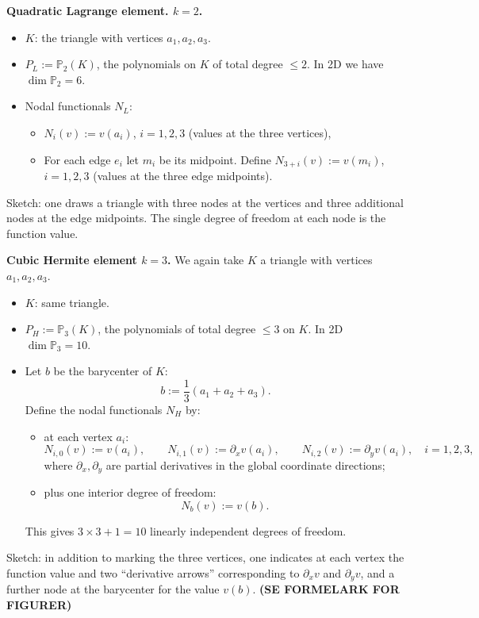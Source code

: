 \textbf{Quadratic Lagrange element. $k=2$.}
\begin{itemize}
    \item $K$: the triangle with vertices $a_1,a_2,a_3$.
    \item $P_L := \mathbb{P}_2(K)$, the polynomials on $K$ of total degree $\le 2$.
          In 2D we have $\dim \mathbb{P}_2 = 6$.
    \item Nodal functionals $N_L$:
          \begin{itemize}
              \item $N_i(v) := v(a_i)$, $i=1,2,3$ (values at the three vertices),
              \item For each edge $e_i$ let $m_i$ be its midpoint.
                    Define $N_{3+i}(v) := v(m_i)$, $i=1,2,3$ (values at the three edge midpoints).
          \end{itemize}
\end{itemize}
Sketch: one draws a triangle with
three nodes at the vertices and three additional nodes at the edge midpoints.
The single degree of freedom at each node is the function value.

\textbf{Cubic Hermite element $k=3$.}
We again take $K$ a triangle with vertices $a_1,a_2,a_3$.
\begin{itemize}
    \item $K$: same triangle.
    \item $P_H := \mathbb{P}_3(K)$, the polynomials of total degree $\le 3$ on $K$.
          In 2D $\dim \mathbb{P}_3 = 10$.
    \item Let $b$ be the barycenter of $K$:
          \[
              b := \frac{1}{3}(a_1+a_2+a_3).
          \]
          Define the nodal functionals $N_H$ by:
          \begin{itemize}
              \item at each vertex $a_i$:
                    \[
                        N_{i,0}(v) := v(a_i), \qquad
                        N_{i,1}(v) := \partial_x v(a_i), \qquad
                        N_{i,2}(v) := \partial_y v(a_i), \quad i=1,2,3,
                    \]
                    where $\partial_x,\partial_y$ are partial derivatives
                    in the global coordinate directions;
              \item plus one interior degree of freedom:
                    \[
                        N_b(v) := v(b).
                    \]
          \end{itemize}
          This gives $3\times 3 + 1 = 10$ linearly independent degrees of freedom.
\end{itemize}
Sketch: in addition to marking the three vertices, one indicates at each vertex
the function value and two “derivative arrows'' corresponding to
$\partial_x v$ and $\partial_y v$, and a further node at the barycenter
for the value $v(b)$.
\textbf{(SE FORMELARK FOR FIGURER)}
